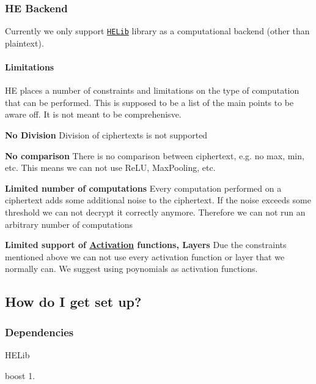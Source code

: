 \subsubsection*{HE Backend}

Currently we only support \href{https://github.com/shaih/HElib}{\tt H\+E\+Lib} library as a computational backend (other than plaintext).

\paragraph*{Limitations}

HE places a number of constraints and limitations on the type of computation that can be performed. This is supposed to be a list of the main points to be aware off. It is not meant to be comprehenisve.


\begin{DoxyItemize}
\item {\bfseries No Division} Division of ciphertexts is not supported
\item {\bfseries No comparison} There is no comparison between ciphertext, e.\+g. no max, min, etc. This means we can not use Re\+LU, Max\+Pooling, etc.
\item {\bfseries Limited number of computations} Every computation performed on a ciphertext adds some additional noise to the ciphertext. If the noise exceeds some threshold we can not decrypt it correctly anymore. Therefore we can not run an arbitrary number of computations
\item {\bfseries Limited support of \hyperlink{classActivation}{Activation} functions, Layers} Due the constraints mentioned above we can not use every activation function or layer that we normally can. We suggest using poynomials as activation functions.
\end{DoxyItemize}

\subsection*{How do I get set up?}

\subsubsection*{Dependencies}


\begin{DoxyItemize}
\item H\+E\+Lib
\item boost 1.
\end{DoxyItemize}

